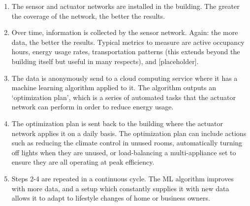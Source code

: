 \documentclass[letterpaper]{article}
\begin{document}
\begin{center}
\begin{enumerate}
\item
    The sensor and actuator networks are installed in the building. The greater the coverage of the network, the better the results.
\item
    Over time, information is collected by the sensor network. Again: the more data, the better the results. Typical metrics to measure are active occupancy hours, energy usage rates, transportation patterns (this extends beyond the building itself but useful in many respects), and [placeholder].
\item
    The data is anonymously send to a cloud computing service where it has a machine learning algorithm applied to it. The algorithm outputs an `optimization plan', which is a series of automated tasks that the actuator network can perform in order to reduce energy usage.
\item
    The optimization plan is sent back to the building where the actuator network applies it on a daily basis. The optimization plan can include actions such as reducing the climate control in unused rooms, automatically turning off lights when they are unused, or load-balancing a multi-appliance set to ensure they are all operating at peak efficiency.
\item
    Steps 2-4 are repeated in a continuous cycle. The ML algorithm improves with more data, and a setup which constantly supplies it with new data allows it to adapt to lifestyle changes of home or business owners.
\end{enumerate}
\end{center}

\clearpage
\printbibliography
\end{document}

